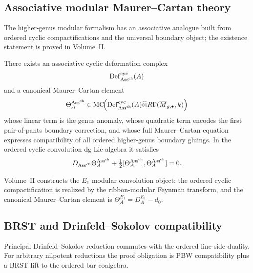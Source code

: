 \subsection{Associative modular Maurer--Cartan theory}

The higher-genus modular formalism has an associative analogue built from ordered cyclic
compactifications and the universal boundary object; the existence statement is proved in
Volume~II.

\begin{theorem}
\label{thm:ordered-associative-modular-mc}
There exists an associative cyclic deformation complex
\[
\mathrm{Def}^{\mathrm{cyc}}_{\mathrm{Ass}^{\mathrm{ch}}}(A)
\]
and a canonical Maurer--Cartan element
\[
\Theta_A^{\mathrm{Ass}^{\mathrm{ch}}}
\in
\operatorname{MC}\!\Bigl(
\mathrm{Def}^{\mathrm{cyc}}_{\mathrm{Ass}^{\mathrm{ch}}}(A)\widehat\otimes
R\Gamma(\overline{M}_{g,\bullet},k)
\Bigr)
\]
whose linear term is the genus anomaly, whose quadratic term encodes the first pair-of-pants
boundary correction, and whose full Maurer--Cartan equation expresses compatibility of all ordered
higher-genus boundary gluings.
In the ordered cyclic convolution dg Lie algebra it satisfies
\[
D_{\mathrm{Ass}^{\mathrm{ch}}}\Theta_A^{\mathrm{Ass}^{\mathrm{ch}}}
+\tfrac{1}{2}[\Theta_A^{\mathrm{Ass}^{\mathrm{ch}}},\Theta_A^{\mathrm{Ass}^{\mathrm{ch}}}]=0.
\]
\end{theorem}

\begin{remark}
Volume~II constructs the
$E_1$ modular convolution object: the ordered cyclic compactification is realized by the
ribbon-modular Feynman transform, and the canonical Maurer--Cartan element is
$\Theta_A^{E_1} = D_A^{E_1} - d_0$.
\end{remark}

\subsection{BRST and Drinfeld--Sokolov compatibility}

Principal Drinfeld--Sokolov reduction commutes with the ordered
line-side duality. For arbitrary nilpotent reductions the proof
obligation is PBW compatibility plus a BRST lift to the ordered bar
coalgebra.

